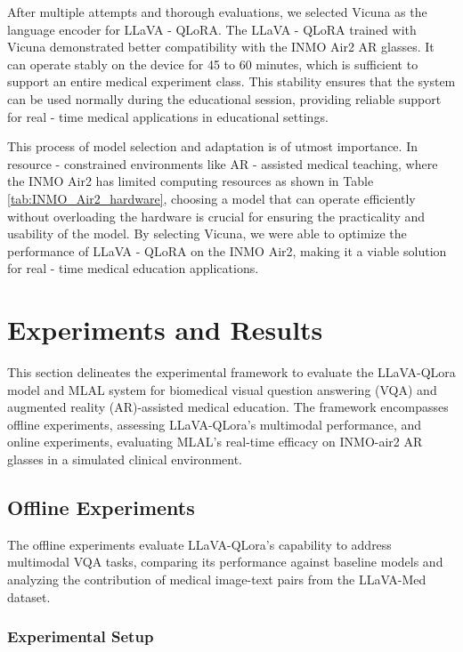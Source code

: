 \documentclass[10pt,letterpaper]{article}
\begin{document}
After multiple attempts and thorough evaluations, we selected Vicuna as the language encoder for LLaVA - QLoRA. The LLaVA - QLoRA trained with Vicuna demonstrated better compatibility with the INMO Air2 AR glasses. It can operate stably on the device for 45 to 60 minutes, which is sufficient to support an entire medical experiment class. This stability ensures that the system can be used normally during the educational session, providing reliable support for real - time medical applications in educational settings.

This process of model selection and adaptation is of utmost importance. In resource - constrained environments like AR - assisted medical teaching, where the INMO Air2 has limited computing resources as shown in Table \ref{tab:INMO_Air2_hardware}, choosing a model that can operate efficiently without overloading the hardware is crucial for ensuring the practicality and usability of the model. By selecting Vicuna, we were able to optimize the performance of LLaVA - QLoRA on the INMO Air2, making it a viable solution for real - time medical education applications.


\section*{Experiments and Results}

This section delineates the experimental framework to evaluate the LLaVA-QLora model and MLAL system for biomedical visual question answering (VQA) and augmented reality (AR)-assisted medical education. The framework encompasses offline experiments, assessing LLaVA-QLora’s multimodal performance, and online experiments, evaluating MLAL’s real-time efficacy on INMO-air2 AR glasses in a simulated clinical environment.


\subsection*{Offline Experiments}
\label{sec:offline_experiments}

The offline experiments evaluate LLaVA-QLora’s capability to address multimodal VQA tasks, comparing its performance against baseline models and analyzing the contribution of medical image-text pairs from the LLaVA-Med dataset.

\subsubsection*{Experimental Setup} 
\end{document}

